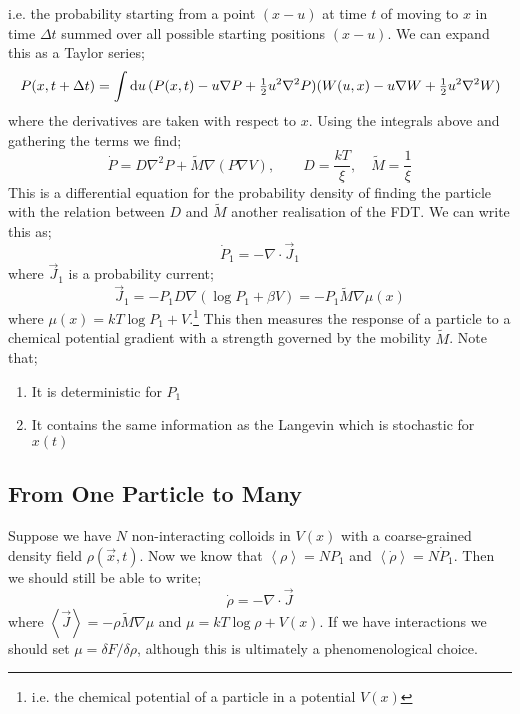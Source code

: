 i.e. the probability starting from a point $(x - u)$ at time $t$ of moving to $x$ in time $\Delta t$ summed over all possible starting positions $(x - u)$. We can expand this as a Taylor series;
\begin{equation*}
P(x, t + \Delta t) = \int{\text{d}u \,(P(x, t) - u\nabla P + \tfrac{1}{2}u^2\nabla^2 P)(W(u, x) - u\nabla W + \tfrac{1}{2}u^2\nabla^2 W)}
\end{equation*}
where the derivatives are taken with respect to $x$. Using the integrals above and gathering the terms we find;
\begin{equation}
\dot{P} = D\nabla^2 P + \tilde{M}\nabla(P\nabla V), \qquad D = \frac{kT}{\xi}, \quad \tilde{M} = \frac{1}{\xi}
\end{equation}
This is a differential equation for the probability density of finding the particle with the relation between $D$ and $\tilde{M}$ another realisation of the FDT. We can write this as;
\begin{equation*}
\dot{P}_1 = -\nabla \cdot \vec{J}_1
\end{equation*}
where $\vec{J}_1$ is a probability current;
\begin{equation}
\vec{J}_1 = -P_1 D\nabla\left(\log P_1 + \beta V\right) = -P_1 \tilde{M}\nabla \mu(x)
\end{equation}
where $\mu(x) = kT \log P_1 + V$.\footnote{i.e. the chemical potential of a particle in a potential $V(x)$} This then measures the response of a particle to a chemical potential gradient with a strength governed by the mobility $\tilde{M}$. Note that;
\begin{enumerate}
\item It is deterministic for $P_1$
\item It contains the same information as the Langevin which is stochastic for $x(t)$
\end{enumerate}
\subsection{From One Particle to Many}
Suppose we have $N$ non-interacting colloids in $V(x)$ with a coarse-grained density field $\rho(\vec{x}, t)$. Now we know that $\left< \rho \right> = NP_1$ and $\left< \dot{\rho} \right> = N\dot{P}_1$. Then we should still be able to write;
\begin{equation}
\dot{\rho} = -\nabla \cdot \vec{J}
\end{equation}
where $\left< \vec{J} \right> = -\rho\tilde{M}\nabla \mu$ and $\mu = kT \log \rho + V(x)$. If we have interactions we should set $\mu = \delta F / \delta \rho$, although this is ultimately a phenomenological choice. 

